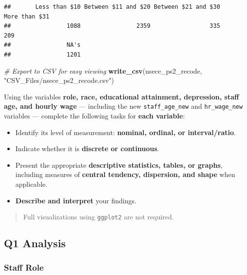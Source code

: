 \documentclass[
]{article}
\newenvironment{Shaded}{\begin{snugshade}}{\end{snugshade}}
\newcommand{\CommentTok}[1]{\textcolor[rgb]{0.56,0.35,0.01}{\textit{#1}}}
\newcommand{\FunctionTok}[1]{\textcolor[rgb]{0.13,0.29,0.53}{\textbf{#1}}}
\newcommand{\NormalTok}[1]{#1}
\newcommand{\StringTok}[1]{\textcolor[rgb]{0.31,0.60,0.02}{#1}}
\providecommand{\tightlist}{%
  \setlength{\itemsep}{0pt}\setlength{\parskip}{0pt}}
\begin{document}
\begin{verbatim}
##       Less than $10 Between $11 and $20 Between $21 and $30       More than $31 
##                1088                2359                 335                 209 
##                NA's 
##                1201
\end{verbatim}

\begin{Shaded}
\begin{Highlighting}[]
\CommentTok{\# Export to CSV for easy viewing}
\FunctionTok{write\_csv}\NormalTok{(nsece\_ps2\_recode, }\StringTok{"CSV\_Files/nsece\_ps2\_recode.csv"}\NormalTok{)}
\end{Highlighting}
\end{Shaded}

Using the variables \textbf{role, race, educational attainment,
depression, staff age, and hourly wage} --- including the new
\texttt{staff\_age\_new} and \texttt{hr\_wage\_new} variables ---
complete the following tasks for \textbf{each variable}:

\begin{itemize}
\tightlist
\item
  Identify its level of measurement: \textbf{nominal, ordinal, or
  interval/ratio}.
\item
  Indicate whether it is \textbf{discrete or continuous}.
\item
  Present the appropriate \textbf{descriptive statistics, tables, or
  graphs}, including measures of \textbf{central tendency, dispersion,
  and shape} when applicable.
\item
  \textbf{Describe and interpret} your findings.
\end{itemize}

\begin{quote}
Full visualizations using \texttt{ggplot2} are not required.
\end{quote}

\newpage

\subsection{Q1 Analysis}\label{q1-analysis}

\subsubsection{Staff Role}\label{staff-role}
\end{document}
